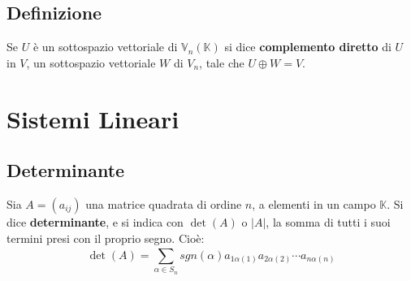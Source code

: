 \documentclass{article}
\newcommand{\Vx}[1]{\mathbb{V}_#1 (\mathbb{K})}
\newcommand{\ah}{\alpha}
\begin{document}
\subsection{Definizione}
Se $U$ è un sottospazio vettoriale di $\Vx{n}$ si dice \textbf{complemento
    diretto} di $U$ in $V$, un sottospazio vettoriale $W$ di $V_n$, tale che
$U\oplus{W} = V$.

\section{Sistemi Lineari}
\subsection{Determinante}
Sia $A = (a_{ij})$ una matrice quadrata di ordine $n$, a elementi in un campo
$\mathbb{K}$. Si dice \textbf{determinante}, e si indica con $\det(A)$ o $|A|$,
la somma di tutti i suoi termini presi con il proprio segno. Cioè:
\[
    \det(A) = \sum_{\ah\in S_n}^{}sgn(\ah)a_{1\ah(1)}a_{2\ah(2)}\cdots a_{n\ah(n)}
\]
\end{document}
